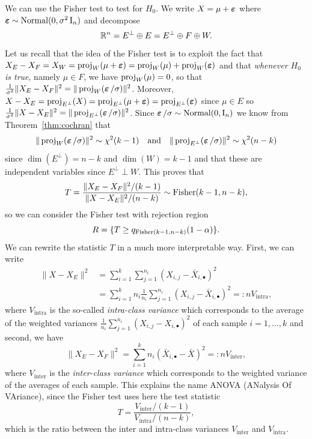 We can use the Fisher test to test for $H_0$.
We write $X = \mu + \operatorname{\boldsymbol \varepsilon}$ where $\operatorname{\boldsymbol \varepsilon} \sim \operatorname{Normal}(0, \sigma^2 \operatorname{{\boldsymbol I}}_n)$ and decompose 
\begin{equation*}
	\mathbb R^n = E^\perp \oplus E = E^\perp \oplus F \oplus W.
\end{equation*}
Let us recall that the idea of the Fisher test is to exploit the fact that $X_E - X_F = X_W = \operatorname{proj}_W(\mu + \operatorname{\boldsymbol \varepsilon}) = \operatorname{proj}_W(\mu) + \operatorname{proj}_W(\operatorname{\boldsymbol \varepsilon})$ and that \emph{whenever $H_0$ is true}, namely $\mu \in F$, we have $\operatorname{proj}_W(\mu) = 0$, so that $\frac{1}{\sigma^2} \| X_E - X_F \|^2 = \| \operatorname{proj}_W( \operatorname{\boldsymbol \varepsilon} / \sigma) \|^2$. 
Moreover, $X - X_E = \operatorname{proj}_{E^\perp}(X) = \operatorname{proj}_{E^\perp}(\mu + \operatorname{\boldsymbol \varepsilon}) = \operatorname{proj}_{E^\perp}(\operatorname{\boldsymbol \varepsilon})$ since $\mu \in E$ so $\frac{1}{\sigma^2} \| X - X_E \|^2 = \| \operatorname{proj}_{E^\perp}( \operatorname{\boldsymbol \varepsilon} / \sigma) \|^2$.
Since $\operatorname{\boldsymbol \varepsilon} / \sigma \sim \operatorname{Normal}(0, \operatorname{{\boldsymbol I}}_n)$ we know from Theorem~\ref{thm:cochran} that
\begin{equation*}
	\| \operatorname{proj}_W( \operatorname{\boldsymbol \varepsilon} / \sigma) \|^2 \sim \chi^2(k-1) \quad \text{and} \quad
\| \operatorname{proj}_{E^\perp}( \operatorname{\boldsymbol \varepsilon} / \sigma) \|^2 \sim \chi^2(n-k)
\end{equation*}
since $\dim(E^\perp) = n - k$ and $\dim(W) = k-1$ and that these are independent variables since $E^\perp \perp W$.
This proves that
\begin{equation*}
  T = \frac{\| X_E - X_F \|^2 / (k-1)}{\| X - X_E \|^2 / (n-k)} \sim \operatorname{Fisher}(k-1, n-k),
\end{equation*}
so we can consider the Fisher test with rejection region 
\begin{equation*}
	R = \{ T \geq q_{\operatorname{Fisher}(k-1, n-k)}(1 - \alpha) \}.
\end{equation*}
We can rewrite the statistic $T$ in a much more interpretable way.
First, we can write
\begin{align*}
  \| X - X_E \|^2 &= \sum_{i=1}^k \sum_{j=1}^{n_i} (X_{i, j} - \bar X_{i, \bullet})^2 \\
  &= \sum_{i=1}^k n_i  \frac{1}{n_i} \sum_{j=1}^{n_i} (X_{i, j} - \bar X_{i, \bullet})^2 =: n V_{\text{intra}},
\end{align*}
where $V_{\text{intra}}$ is the so-called \emph{intra-class variance}%
which corresponds to the average of the weighted%
 variances $\frac{1}{n_i} \sum_{j=1}^{n_i} (X_{i, j} - X_{i, \bullet})^2$ of each sample  $i=1, \ldots, k$ and second, we have
\begin{equation*}
  \| X_E - X_F \|^2 = \sum_{i=1}^k n_i (\bar X_{i, \bullet} - \bar X)^2 =: n V_{\text{inter}},
\end{equation*}
where $V_{\text{inter}}$ is the \emph{inter-class variance} which corresponds to the weighted variance of the averages of each sample.
This explains the name ANOVA (ANalysis Of VAriance), since the Fisher test uses here the test statistic
\begin{equation*}
  T = \frac{V_\text{inter} / (k-1)}{V_\text{intra} / (n - k)},
\end{equation*}
which is the ratio between the inter and intra-class variances $V_{\text{inter}}$ and $V_\text{intra}$.


